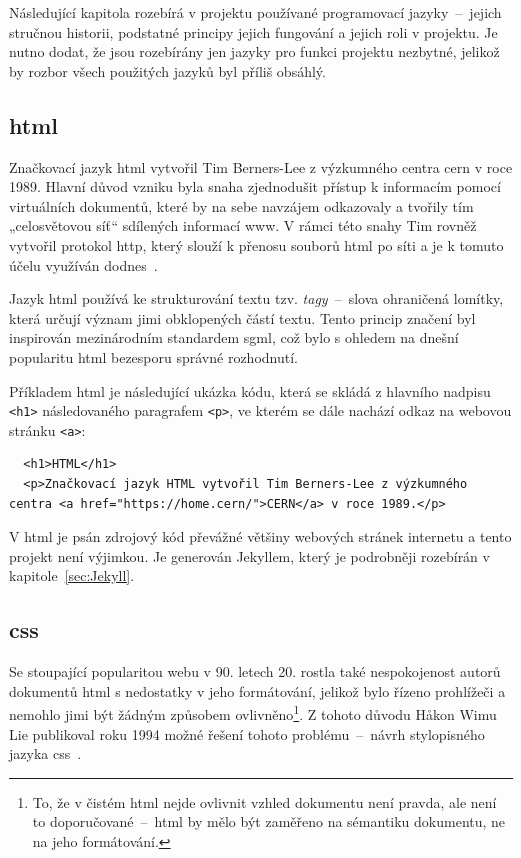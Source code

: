 \documentclass[a4paper, 12pt, twoside]{article}
\begin{document}
  Následující kapitola rozebírá v projektu používané programovací jazyky~--~jejich stručnou historii, podstatné principy jejich fungování a jejich roli v projektu. Je nutno dodat, že jsou rozebírány jen jazyky pro funkci projektu nezbytné, jelikož by rozbor všech použitých jazyků byl příliš obsáhlý.


  \subsection{\acrshort{html}} \label{sec:HTML}
  Značkovací jazyk \gls{html} vytvořil Tim Berners-Lee z výzkumného centra \gls{cern} v roce 1989. Hlavní důvod vzniku byla snaha zjednodušit přístup k informacím pomocí virtuálních dokumentů, které by na sebe navzájem odkazovaly a tvořily tím „celosvětovou síť“ sdílených informací \gls{www}. V rámci této snahy Tim rovněž vytvořil protokol \gls{http}, který slouží k přenosu souborů \gls{html} po síti a je k tomuto účelu využíván dodnes~\cite{html-history}.

  Jazyk \gls{html} používá ke strukturování textu tzv. \emph{tagy}~--~slova ohraničená lomítky, která určují význam jimi obklopených částí textu. Tento princip značení byl inspirován mezinárodním standardem \gls{sgml}, což bylo s ohledem na dnešní popularitu \gls{html} bezesporu správné rozhodnutí.

  Příkladem \gls{html} je následující ukázka kódu, která se skládá z hlavního nadpisu \texttt{<h1>} následovaného paragrafem \texttt{<p>}, ve kterém se dále nachází odkaz na webovou stránku \texttt{<a>}:

  \begin{verbatim}
  <h1>HTML</h1>
  <p>Značkovací jazyk HTML vytvořil Tim Berners-Lee z výzkumného centra <a href="https://home.cern/">CERN</a> v roce 1989.</p>
  \end{verbatim}

  V \gls{html} je psán zdrojový kód převážné většiny webových stránek internetu a tento projekt není výjimkou. Je generován Jekyllem, který je podrobněji rozebírán v kapitole~\ref{sec:Jekyll}.


  \subsection{\acrshort{css}} \label{sec:CSS}
  Se stoupající popularitou webu v 90. letech 20. rostla také nespokojenost autorů dokumentů \gls{html} s nedostatky v jeho formátování, jelikož bylo řízeno prohlížeči a nemohlo jimi být žádným způsobem ovlivněno\footnote{To, že v čistém \gls{html} nejde ovlivnit vzhled dokumentu není pravda, ale není to doporučované~--~\gls{html} by mělo být zaměřeno na sémantiku dokumentu, ne na jeho formátování.}. Z tohoto důvodu Håkon Wimu Lie publikoval roku 1994 možné řešení tohoto problému~--~návrh stylopisného jazyka \gls{css}~\cite{css-proposal,css-saga}.
\end{document}
